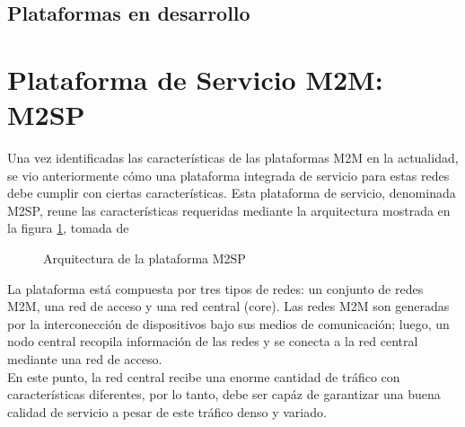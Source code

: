 \documentclass[journal]{IEEEtran}
\begin{document}
\subsection{Plataformas en desarrollo}


\section{Plataforma de Servicio M2M: M2SP}

Una vez identificadas las características de las plataformas M2M en la actualidad, se vio anteriormente cómo una plataforma integrada de servicio para estas redes debe cumplir con ciertas características. Esta plataforma de servicio, denominada M2SP, reune las características requeridas mediante la arquitectura mostrada en la figura \ref{arqM2SP}, tomada de \cite{paper1} 

\begin{figure}[h]
\centering
{}
\caption{Arquitectura de la plataforma M2SP}
\label{arqM2SP}
\end{figure}

La plataforma está compuesta por tres tipos de redes: un conjunto de redes M2M, una red de acceso y una red central (core). Las redes M2M son generadas por la interconección de dispositivos bajo sus medios de comunicación; luego, un nodo central recopila información de las redes y se conecta a la red central mediante una red de acceso.\\

En este punto, la red central recibe una enorme cantidad de tráfico con características diferentes, por lo tanto, debe ser capáz de garantizar una buena calidad de servicio a pesar de este tráfico denso y variado.\\
\end{document}
